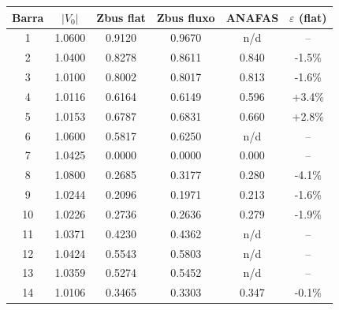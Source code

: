 \begin{tabular}{cccccc}
\toprule
Barra & $|V_0|$ & Zbus flat & Zbus fluxo & ANAFAS & $\varepsilon$ (flat) \\
\midrule
1 & 1.0600 & 0.9120 & 0.9670 & n/d & -- \\
2 & 1.0400 & 0.8278 & 0.8611 & 0.840 & -1.5\% \\
3 & 1.0100 & 0.8002 & 0.8017 & 0.813 & -1.6\% \\
4 & 1.0116 & 0.6164 & 0.6149 & 0.596 & +3.4\% \\
5 & 1.0153 & 0.6787 & 0.6831 & 0.660 & +2.8\% \\
6 & 1.0600 & 0.5817 & 0.6250 & n/d & -- \\
7 & 1.0425 & 0.0000 & 0.0000 & 0.000 & -- \\
8 & 1.0800 & 0.2685 & 0.3177 & 0.280 & -4.1\% \\
9 & 1.0244 & 0.2096 & 0.1971 & 0.213 & -1.6\% \\
10 & 1.0226 & 0.2736 & 0.2636 & 0.279 & -1.9\% \\
11 & 1.0371 & 0.4230 & 0.4362 & n/d & -- \\
12 & 1.0424 & 0.5543 & 0.5803 & n/d & -- \\
13 & 1.0359 & 0.5274 & 0.5452 & n/d & -- \\
14 & 1.0106 & 0.3465 & 0.3303 & 0.347 & -0.1\% \\
\bottomrule
\end{tabular}
